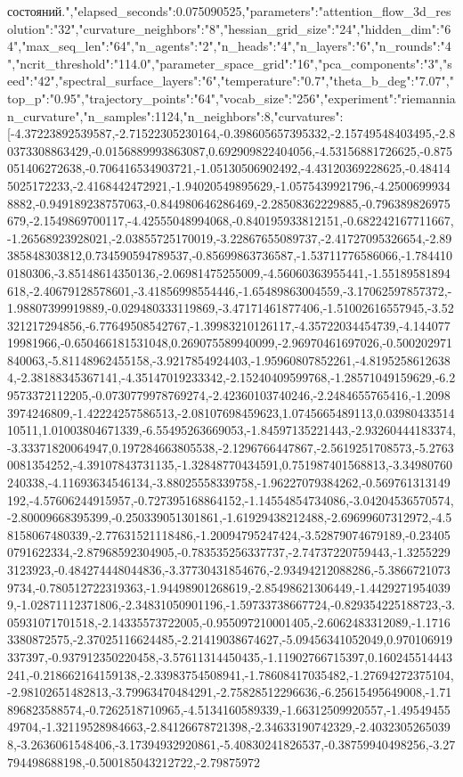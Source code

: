 \documentclass{article}
\begin{document}
состояний.","elapsed_seconds":0.075090525,"parameters":{"attention_flow_3d_resolution":"32","curvature_neighbors":"8","hessian_grid_size":"24","hidden_dim":"64","max_seq_len":"64","n_agents":"2","n_heads":"4","n_layers":"6","n_rounds":"4","ncrit_threshold":"114.0","parameter_space_grid":"16","pca_components":"3","seed":"42","spectral_surface_layers":"6","temperature":"0.7","theta_b_deg":"7.07","top_p":"0.95","trajectory_points":"64","vocab_size":"256"},"experiment":"riemannian_curvature","n_samples":1124,"n_neighbors":8,"curvatures":[-4.37223892539587,-2.71522305230164,-0.398605657395332,-2.15749548403495,-2.80373308863429,-0.0156889993863087,0.692909822404056,-4.53156881726625,-0.875051406272638,-0.706416534903721,-1.05130506902492,-4.43120369228625,-0.484145025172233,-2.4168442472921,-1.94020549895629,-1.0575439921796,-4.25006999348882,-0.949189238757063,-0.844980646286469,-2.28508362229885,-0.796389826975679,-2.1549869700117,-4.42555048994068,-0.840195933812151,-0.682242167711667,-1.26568923928021,-2.03855725170019,-3.22867655089737,-2.41727095326654,-2.89385848303812,0.734590594789537,-0.85699863736587,-1.53711776586066,-1.7844100180306,-3.85148614350136,-2.06981475255009,-4.56060363955441,-1.55189581894618,-2.40679128578601,-3.41856998554446,-1.65489863004559,-3.17062597857372,-1.98807399919889,-0.029480333119869,-3.47171461877406,-1.51002616557945,-3.52321217294856,-6.77649508542767,-1.39983210126117,-4.35722034454739,-4.14407719981966,-0.650466181531048,0.269075589940099,-2.96970461697026,-0.500202971840063,-5.81148962455158,-3.9217854924403,-1.95960807852261,-4.81952586126384,-2.38188345367141,-4.35147019233342,-2.15240409599768,-1.28571049159629,-6.29573372112205,-0.0730779978769274,-2.42360103740246,-2.2484655765416,-1.20983974246809,-1.42224257586513,-2.08107698459623,1.0745665489113,0.0398043351410511,1.01003804671339,-6.55495263669053,-1.84597135221443,-2.93260444183374,-3.33371820064947,0.197284663805538,-2.1296766447867,-2.5619251708573,-5.27630081354252,-4.39107843731135,-1.32848770434591,0.751987401568813,-3.34980760240338,-4.11693634546134,-3.88025558339758,-1.96227079384262,-0.569761313149192,-4.57606244915957,-0.727395168864152,-1.14554854734086,-3.04204536570574,-2.80009668395399,-0.250339051301861,-1.61929438212488,-2.69699607312972,-4.58158067480339,-2.77631521118486,-1.20094795247424,-3.52879074679189,-0.234050791622334,-2.87968592304905,-0.783535256337737,-2.74737220759443,-1.32552293123923,-0.484274448044836,-3.37730431854676,-2.93494212088286,-5.38667210739734,-0.780512722319363,-1.94498901268619,-2.85498621306449,-1.44292719540399,-1.02871112371806,-2.34831050901196,-1.59733738667724,-0.829354225188723,-3.05931071701518,-2.14335573722005,-0.955097210001405,-2.6062483312089,-1.17163380872575,-2.37025116624485,-2.21419038674627,-5.09456341052049,0.970106919337397,-0.937912350220458,-3.57611314450435,-1.11902766715397,0.160245514443241,-0.218662164159138,-2.33983754508941,-1.78608417035482,-1.27694272375104,-2.98102651482813,-3.79963470484291,-2.75828512296636,-6.25615495649008,-1.71896823588574,-0.7262518710965,-4.5134160589339,-1.66312509920557,-1.4954945549704,-1.32119528984663,-2.84126678721398,-2.34633190742329,-2.40323052650398,-3.2636061548406,-3.17394932920861,-5.40830241826537,-0.38759940498256,-3.27794498688198,-0.500185043212722,-2.79875972
\end{document}

